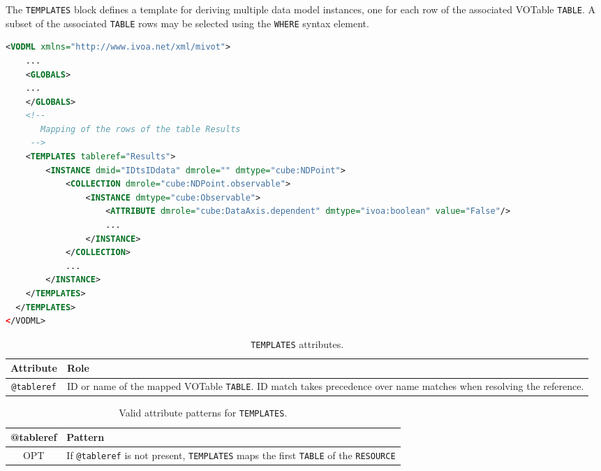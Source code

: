 The \texttt{TEMPLATES} block defines a template for deriving multiple data model instances,
one for each row of the associated VOTable \texttt{TABLE}.  A subset of the associated
\texttt{TABLE} rows may be selected using the \texttt{WHERE} syntax element.

\begin{lstlisting}[caption={Example of a \texttt{TEMPLATES} block mapping the rows of the table \texttt{Results} (see line~\ref{TEMPLATES_snippet} in Appendix~\ref{appendix_A}).
Each row of the table named \texttt{Results} is be mapped on an instance of the VO-DML type \texttt{cube:NDPoint}.
Instances mapping a table row do not play any particular role.},language=XML]
<VODML xmlns="http://www.ivoa.net/xml/mivot">
    ...
    <GLOBALS>
    ...
    </GLOBALS>
    <!--
       Mapping of the rows of the table Results
     -->  
    <TEMPLATES tableref="Results">
        <INSTANCE dmid="IDtsIDdata" dmrole="" dmtype="cube:NDPoint">
            <COLLECTION dmrole="cube:NDPoint.observable">
                <INSTANCE dmtype="cube:Observable">
                    <ATTRIBUTE dmrole="cube:DataAxis.dependent" dmtype="ivoa:boolean" value="False"/>
                    ...
                </INSTANCE>
            </COLLECTION>
            ...
        </INSTANCE>
    </TEMPLATES>
  </TEMPLATES>
</VODML>
\end{lstlisting}

\begin{table}[!htbp]
  \small
  \centering
  \begin{tabulary}{\linewidth}{|c|J|}
    \hline 
         \textbf{Attribute} & 
         \textbf {Role}\\
    \hline
    \hline  
         \texttt{@tableref} & 
         ID or name of the mapped VOTable \texttt{TABLE}. ID match takes precedence over name matches when resolving the reference. \\
    \hline 
  \end{tabulary}
  \caption{\texttt{TEMPLATES} attributes.} 
  \label{tbl:templates-att}
\end{table}

\begin{table}[!htbp]
  \small
  \centering
  \begin{tabulary}{\linewidth}{|c|J|}
    \hline 
        \textbf{@tableref} &
        \textbf{Pattern}\\
    \hline
    \hline  
        OPT &           
        If \texttt{@tableref} is not present, \texttt{TEMPLATES} maps the first \texttt{TABLE} of the \texttt{RESOURCE}\\
    \hline 
  \end{tabulary}
  \caption{Valid attribute patterns for  \texttt{TEMPLATES}.} 
  \label{tbl:templates-pattern}
 \end{table}

